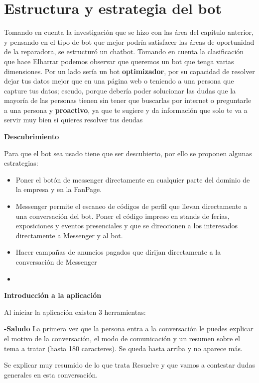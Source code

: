 \chapter{Estructura y estrategia del bot}

Tomando en cuenta la investigación que se hizo con las área del capítulo anterior, y pensando en el tipo de bot que mejor podría satisfacer las áreas de oportunidad de la reparadora, se estructuró un chatbot.
Tomando en cuenta la clasificación que hace Elharrar \cite{elharrar_2017} podemos observar que queremos un bot que tenga varias dimensiones. Por un lado sería un bot \textbf{optimizador}, por su capacidad de resolver dejar tus datos mejor que en una página web o teniendo a una persona que capture tus datos; escudo, porque debería poder solucionar las dudas que la mayoría de las personas tienen sin tener que buscarlas por internet o preguntarle a una persona  y \textbf{proactivo}, ya que te sugiere y da información que solo te va a servir muy bien si quieres resolver tus deudas

\textbf{Descubrimiento}

Para que el bot sea usado tiene que ser descubierto, por ello se proponen algunas estrategias:
\begin{itemize}
\item Poner el botón de messenger directamente en cualquier parte del dominio de la empresa y en la FanPage.
\item Messenger permite el escaneo de códigos de perfil que llevan directamente a una conversación del bot. Poner el código impreso en stands de  ferias, exposiciones y eventos presenciales y que se direccionen a los interesados directamente a Messenger y al bot.
\item Hacer campañas de anuncios pagados que dirijan directamente a la conversación de Messenger
\item 
\end{itemize}

\textbf{Introducción a la aplicación}

Al iniciar la aplicación existen 3 herramientas:

\textbf{-Saludo}
La primera vez que la persona entra a la conversación le puedes explicar el motivo de la conversación, el modo de comunicación y un resumen sobre el tema a tratar (hasta 180 caracteres). Se queda hasta arriba y no aparece más.

Se explicar muy resumido de lo que trata Resuelve y que vamos a contestar dudas generales en esta conversación.

